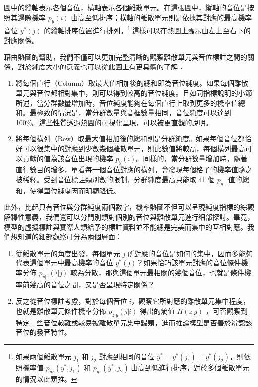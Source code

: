         圖中的縱軸表示各個音位，橫軸表示各個離散單元。在這張圖中，縱軸的音位是按照其邊際機率 \(p_y(i)\) 由高至低排序；橫軸的離散單元則是依據其對應的最高機率音位 \(y^\ast(j)\) 的縱軸排序位置進行排列。\footnote{如果兩個離散單元 \(j_1\) 和 \(j_2\) 對應到相同的音位 \(y^\ast = y^\ast(j_1) = y^\ast(j_2)\)，則依照機率值 \(p_{yz}(y^\ast, j_1)\) 和 \(p_{yz}(y^\ast, j_2)\) 由高到低進行排序，對於多個離散單元的情況以此類推。} 這樣可以在熱圖上顯示由左上至右下的對應關係。

        藉由熱圖的幫助，我們不僅可以更加完整清晰的觀察離散單元與音位標註之間的關係，對於純度大小的意義也可以從此圖上有更具體的了解：

        \begin{enumerate}
            \item 將每個直行（Column）取最大值相加後的總和即為音位純度。如果每個離散單元與音位都相對集中，則可以得到較高的音位純度。且如同指標說明的小節所述，當分群數量增加時，音位純度能夠在每個直行上取到更多的機率值總和。最極致的情況是，當分群數量與音框數量相同，音位純度可以達到 100\%。這些性質透過熱圖的可視化呈現，可以被更直觀的說明。

            \item 將每個橫列（Row）取最大值相加後的總和則是分群純度。如果每個音位都恰好可以很集中的對應到少數幾個離散單元，則此數值將較高，每個橫列最高可以貢獻的值為該音位出現的機率 $p_{y}(i)$。同樣的，當分群數量增加時，隨著直行數目的增多，單看每一個音位對應的橫列，會發現每個格子的機率值隨之被稀釋。受到音位標註類別數的限制，分群純度最高只能取 41 個 $p_{yz}$ 值的總和，使得單位純度因而明顯降低。
        \end{enumerate}

        此外，比起只有音位與分群純度兩個數字，機率熱圖不但可以呈現純度指標的綜觀解釋性意義，我們還可以分門別類對個別的音位與離散單元進行細部探討。畢竟，模型的虛擬標註與實際人類給予的標註資料並不能總是完美而集中的互相對應。我們想知道的細部觀察可分為兩個層面：

        \begin{enumerate}
            \item 從離散單元的角度出發，每個單元 $j$ 所對應的音位是如何的集中，因而多能夠代表這個單元中最高機率的音位 $y^*(j)$？如果恰巧該單元對應的音位條件機率分佈 $p_{y|z}(i|j)$ 較為分散，那與這個單元最相關的幾個音位，也就是條件機率前幾高的音位之間，又是否呈現特定關係？
            \item 反之從音位標註考慮，對於每個音位 $i$，觀察它所對應的離散單元集中程度，也就是離散單元條件機率分佈 $p_{z|y}(j|i)$ 得出的熵值 $H(z|y)$ ，可否觀察到特定一些音位較難或較易被離散單元集中歸類，進而推論模型是否善於辨認該音位的發音特性。
        \end{enumerate}

